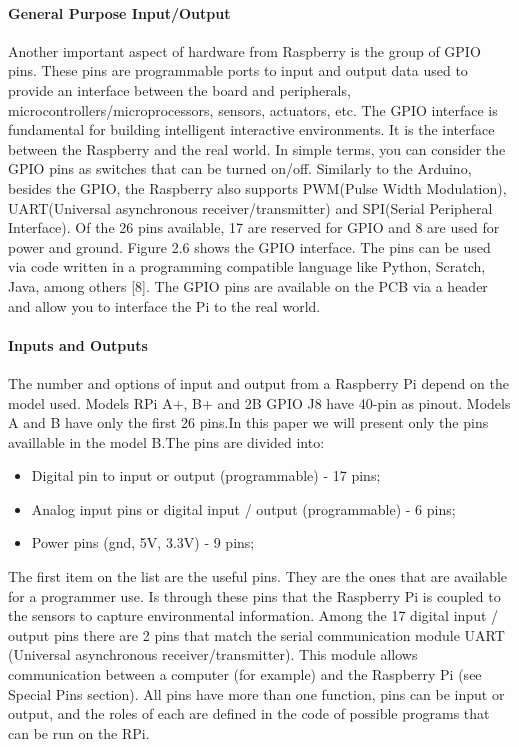 \documentclass{acm_proc_article-sp}
\begin{document}
\paragraph{General Purpose Input/Output}
Another important aspect of hardware from Raspberry is the group of GPIO pins. These pins are programmable ports to input and output data used to provide an interface between the board and peripherals, microcontrollers/microprocessors, sensors, actuators, etc. The GPIO interface is fundamental for building intelligent interactive environments. It is the interface between the Raspberry and the real world. In simple terms, you can consider the GPIO pins as switches that can be turned on/off.
\newline
\newline
Similarly to the Arduino, besides the GPIO, the Raspberry also supports PWM(Pulse Width Modulation), UART(Universal asynchronous receiver/transmitter) and SPI(Serial Peripheral Interface). Of the 26 pins available, 17 are reserved for GPIO and 8 are used for power and ground. Figure 2.6 shows the GPIO interface. The pins can be used via code written in a programming compatible language like Python, Scratch, Java, among others [8].
The GPIO pins are available on the PCB via a header and allow you to interface the Pi to the real world.

\paragraph{Inputs and Outputs}
The number and options of input and output from a Raspberry Pi depend on the model used. Models RPi A+, B+ and 2B GPIO J8 have 40-pin as pinout. Models A and B have only the first 26 pins.In this paper we will present only the pins availlable in the model B.The pins are divided into:

\begin{itemize}
\item Digital pin to input or output (programmable) - 17 pins;	
\item Analog input pins or digital input / output (programmable) - 6 pins;
\item Power pins (gnd, 5V, 3.3V) - 9 pins;
\end{itemize}

The first item on the list are the useful pins. They are the ones that are available for a programmer use. Is through these pins that the Raspberry Pi is coupled to the sensors to capture environmental information. Among the 17 digital input / output pins there are 2 pins that match the serial communication module UART (Universal asynchronous receiver/transmitter). This module allows communication between a computer (for example) and the Raspberry Pi (see Special Pins section). All pins have more than one function, pins can be input or output, and the roles of each are defined in the code of possible programs that can be run on the RPi.
\end{document}
